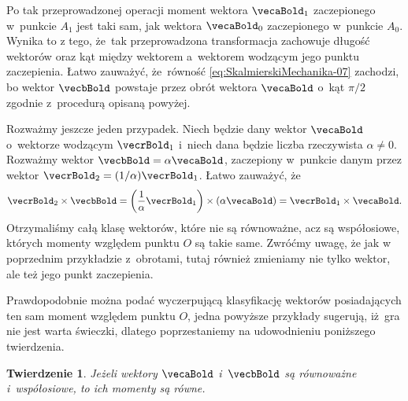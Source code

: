 \documentclass[a4paper,11pt]{article}
\numberwithin{equation}{section}
\newtheorem{theorem}{Twierdzenie}
\begin{document}
Po tak przeprowadzonej operacji moment wektora $\vecaBold_{ 1 }$
zaczepionego w~punkcie $A_{ 1 }$ jest taki sam, jak wektora $\vecaBold_{ 0 }$
zaczepionego w~punkcie $A_{ 0 }$. Wynika to z tego, że~tak przeprowadzona
transformacja zachowuje długość wektorów oraz kąt między wektorem
a~wektorem wodzącym jego punktu zaczepienia. Łatwo zauważyć, że~równość
\eqref{eq:SkalmierskiMechanika-07} zachodzi, bo wektor $\vecbBold$ powstaje
przez obrót wektora $\vecaBold$ o~kąt $\pi / 2$ zgodnie z~procedurą opisaną
powyżej.

Rozważmy jeszcze jeden przypadek. Niech będzie dany wektor $\vecaBold$
o~wektorze wodzącym $\vecrBold_{ 1 }$ i~niech dana będzie liczba rzeczywista
$\alpha \neq 0$. Rozważmy wektor $\vecbBold = \alpha \vecaBold$, zaczepiony w~punkcie
danym przez wektor $\vecrBold_{ 2 } = ( 1 / \alpha ) \vecrBold_{ 1 }$. Łatwo
zauważyć, że
\begin{equation}
  \label{eq:SkalmierskiMechanika-08}
  \vecrBold_{ 2 } \times \vecbBold =
  \left( \frac{ 1 }{ \alpha } \vecrBold_{ 1 } \right) \times ( \alpha \vecaBold ) =
  \vecrBold_{ 1 } \times \vecaBold.
\end{equation}
Otrzymaliśmy całą klasę wektorów, które nie są równoważne, acz są
współosiowe, których momenty względem punktu $O$ są takie same. Zwróćmy
uwagę, że jak w poprzednim przykładzie z~obrotami, tutaj również zmieniamy
nie tylko wektor, ale też jego punkt zaczepienia.

Prawdopodobnie można podać wyczerpującą klasyfikację wektorów posiadających
ten sam moment względem punktu $O$, jedna powyższe przykłady sugerują,
iż~gra nie jest warta świeczki, dlatego poprzestaniemy na udowodnieniu
poniższego twierdzenia.





\begin{theorem}

  Jeżeli wektory $\vecaBold$ i~$\vecbBold$ są równoważne i~współosiowe, to
  ich momenty są równe.

\end{theorem}
\end{document}
